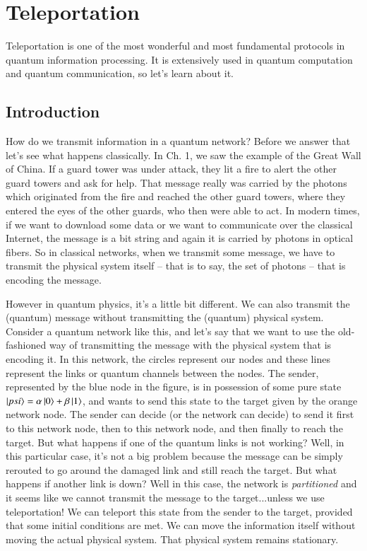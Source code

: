 \chapter{Teleportation}


Teleportation is one of the most wonderful and most fundamental protocols in quantum information processing. It is extensively used in quantum computation and quantum communication, so let's learn about it.

\section{Introduction}


How do we transmit information in a quantum network? Before we answer that let's see what happens classically. In Ch. 1, we saw the example of the Great Wall of China. If a guard tower was under attack, they lit a fire to alert the other guard towers and ask for help. That message really was carried by the photons which originated from the fire and reached the other guard towers, where they entered the eyes of the other guards, who then were able to act. In modern times, if we want to download some data or we want to communicate over the classical Internet, the message is a bit string and again it is carried by photons in optical fibers. So in classical networks, when we transmit some message, we have to transmit the physical system itself  -- that is to say, the set of photons -- that is encoding the message. 

However in quantum physics, it's a little bit different. We can also transmit the (quantum) message without transmitting the (quantum) physical system. Consider a quantum network like this,  and let's say that we want to use the old-fashioned way of transmitting the message with the physical system that is encoding it. In this network, the circles represent our nodes and these lines represent the links or quantum channels between the nodes. The sender, represented by the blue node in the figure, is in possession of some pure state $\ket{psi} = \alpha\ket{0}+\beta\ket{1}$, and  wants to send this state to the target given by the orange network node. The sender can decide (or the network can decide) to send it first to this network node, then to this network node, and then finally to reach the target. But what happens if one of the quantum links is not working? Well, in this particular case, it's not a big problem because the message can be simply rerouted to go around the damaged link and still reach the target. But what happens if another link is down? Well in this case, the network is \emph{partitioned} and it seems like we cannot transmit the message to the target...unless we use teleportation! We can teleport this state from the sender to the target, provided that some initial conditions are met. We can move the information itself without moving the actual physical system. That physical system remains stationary.

